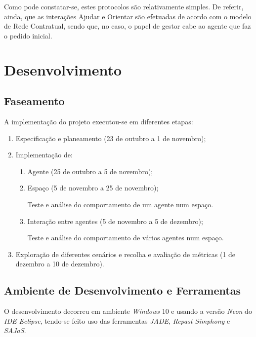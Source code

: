 \documentclass[12pt]{article}
\begin{document}
\begin{titlepage}
\begin{itemize}
\end{itemize}

Como pode constatar-se, estes protocolos são relativamente simples. De referir, ainda, que as interações Ajudar e Orientar são efetuadas de acordo com o modelo de Rede Contratual, sendo que, no caso, o papel de gestor cabe ao agente que faz o pedido inicial. 



\newpage
\section{Desenvolvimento}
\subsection{Faseamento}
A implementação do projeto executou-se em diferentes etapas:
\begin{enumerate}
	\item Especificação e planeamento (23 de outubro a 1 de novembro);
	\item Implementação de:
	 \begin{enumerate} 
	 	\item Agente (25 de outubro a 5 de novembro);
	 	\item Espaço (5 de novembro a 25 de novembro);
	 	
	 	Teste e análise do comportamento de um agente num espaço.
		\item Interação entre agentes (5 de novembro a 5 de dezembro);
		
		Teste e análise do comportamento de vários agentes num espaço. 
	\end{enumerate}
	\item Exploração de diferentes cenários e recolha e avaliação de métricas (1 de dezembro a 10 de dezembro).
\end{enumerate}

\subsection{Ambiente de Desenvolvimento e Ferramentas}
O desenvolvimento decorreu em ambiente \textit{Windows} 10 e usando a versão \textit{Neon} do \textit{IDE Eclipse}, tendo-se feito uso das ferramentas \textit{JADE}, \textit{Repast Simphony} e \textit{SAJaS}.
\newline


\end{titlepage}
\end{document}
